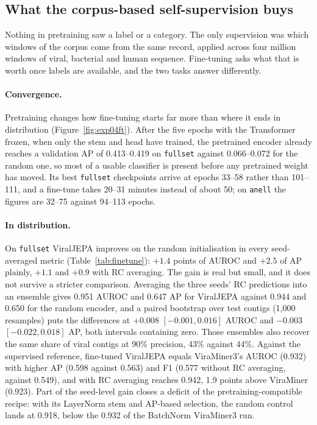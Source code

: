 \documentclass[10pt,twocolumn,a4paper]{article}
\begin{document}
\subsection{What the corpus-based self-supervision buys}\label{sec:res:ft}

Nothing in pretraining saw a label or a category. The only supervision was which
windows of the corpus come from the same record, applied across four million
windows of viral, bacterial and human sequence. Fine-tuning asks what that is
worth once labels are available, and the two tasks answer differently.

\paragraph{Convergence.}
Pretraining changes how fine-tuning starts far more than where it ends in
distribution (Figure~\ref{fig:exp04ft}). After the five epochs with the
Transformer frozen, when only the stem and head have trained, the pretrained
encoder already reaches a validation AP of 0.413--0.419 on \texttt{fullset}
against 0.066--0.072 for the random one, so most of a usable classifier is
present before any pretrained weight has moved. Its best \texttt{fullset}
checkpoints arrive at epochs 33--58 rather than 101--111, and a fine-tune takes
20--31 minutes instead of about 50; on \texttt{anell} the figures are 32--75
against 94--113 epochs.

\paragraph{In distribution.}
On \texttt{fullset} ViralJEPA improves on the random initialisation in every
seed-averaged metric (Table~\ref{tab:finetune}): $+1.4$ points of AUROC and
$+2.5$ of AP plainly, $+1.1$ and $+0.9$ with RC averaging. The gain is real but
small, and it does not survive a stricter comparison. Averaging the three seeds'
RC predictions into an ensemble gives 0.951 AUROC and 0.647 AP for ViralJEPA
against 0.944 and 0.650 for the random encoder, and a paired bootstrap over test
contigs (1{,}000 resamples) puts the differences at $+0.008$ $[-0.001, 0.016]$
AUROC and $-0.003$ $[-0.022, 0.018]$ AP, both intervals containing zero. Those
ensembles also recover the same share of viral contigs at 90\% precision, 43\%
against 44\%.
Against the supervised reference, fine-tuned ViralJEPA equals ViraMiner3's AUROC
(0.932) with higher AP (0.598 against 0.563) and F1 (0.577 without RC averaging,
against 0.549), and with RC averaging reaches 0.942, 1.9 points above ViraMiner
(0.923). Part of the seed-level gain closes a deficit of the
pretraining-compatible recipe: with its LayerNorm stem and AP-based selection,
the random control lands at 0.918, below the 0.932 of the BatchNorm ViraMiner3
run.
\end{document}
